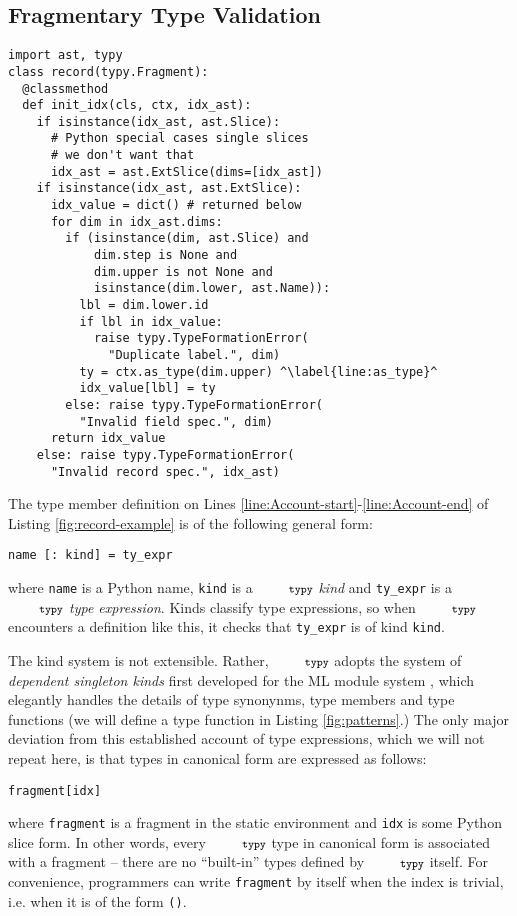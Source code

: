 \documentclass[10pt]{sigplanconf}
\newcommand{\typy}{\texttt{\footnotesize typy}}
\newcommand{\lip}[1]{\lstinline[language=Python,basicstyle=\ttfamily\footnotesize,morekeywords={with},deletendkeywords={tuple,buffer,map}]{#1}}
\begin{document}
\subsection{Fragmentary Type Validation}\label{sec:types}
\begin{codelisting}[t]
\vspace{-3px}
\begin{lstlisting}
import ast, typy
class record(typy.Fragment):
  @classmethod
  def init_idx(cls, ctx, idx_ast):
    if isinstance(idx_ast, ast.Slice):
      # Python special cases single slices
      # we don't want that
      idx_ast = ast.ExtSlice(dims=[idx_ast])
    if isinstance(idx_ast, ast.ExtSlice):
      idx_value = dict() # returned below
      for dim in idx_ast.dims:
        if (isinstance(dim, ast.Slice) and 
            dim.step is None and 
            dim.upper is not None and 
            isinstance(dim.lower, ast.Name)):
          lbl = dim.lower.id
          if lbl in idx_value:
            raise typy.TypeFormationError(
              "Duplicate label.", dim)
          ty = ctx.as_type(dim.upper) ^\label{line:as_type}^
          idx_value[lbl] = ty
        else: raise typy.TypeFormationError(
          "Invalid field spec.", dim)
      return idx_value
    else: raise typy.TypeFormationError(
      "Invalid record spec.", idx_ast)
\end{lstlisting}
\caption{Record type validation.}
\label{fig:type-validation}
\end{codelisting}

The type member definition on Lines \ref{line:Account-start}-\ref{line:Account-end} of Listing \ref{fig:record-example} is of the following general form:
\begin{lstlisting}[numbers=none]
name [: kind] = ty_expr
\end{lstlisting}
where \lip{name} is a Python name, \lip{kind} is a $\typy$ \emph{kind} and \lip{ty_expr} is a $\typy$ \emph{type expression}. Kinds classify type expressions, so when $\typy$ encounters a definition like this, it checks that \lip{ty_expr} is of kind \lip{kind}. 

The kind system is not extensible. Rather, $\typy$ adopts the system of \emph{dependent singleton kinds} first developed for the ML module system \cite{DBLP:conf/lfmtp/Crary09,pfpl}, which elegantly handles the details of type synonynms, type members and type functions (we will define a type function in Listing \ref{fig:patterns}.) The only major deviation from this established account of type expressions, which we will not repeat here, is that types in canonical form are expressed as follows:
\begin{lstlisting}[numbers=none]
fragment[idx]
\end{lstlisting}
where \lip{fragment} is a fragment in the static environment and \lip{idx} is some Python slice form. In other words, every $\typy$ type in canonical form is associated with a fragment -- there are no ``built-in'' types defined by $\typy$ itself. For convenience, programmers can write \lip{fragment} by itself when the index is trivial, i.e. when it is of the form \lip{()}. 
\end{document}

